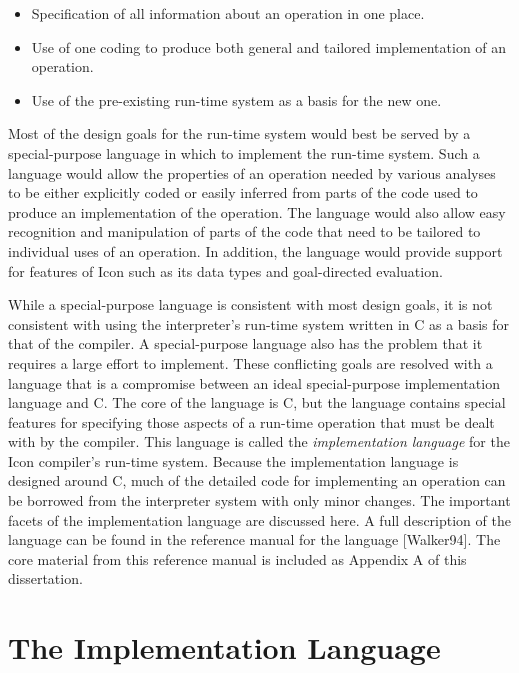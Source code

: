\liststyleLxx
\begin{itemize}

\item Specification of all information about an operation in one place. 

\item Use of one coding to produce both general and tailored
implementation of an operation.

\item Use of the pre-existing run-time system as a basis for the new one. 

\end{itemize}

Most of the design goals for the run-time system would best be served
by a special-purpose language in which to implement the run-time
system. Such a language would allow the properties of an operation
needed by various analyses to be either explicitly coded or easily
inferred from parts of the code used to produce an implementation of
the operation. The language would also allow easy recognition and
manipulation of parts of the code that need to be tailored to
individual uses of an operation. In addition, the language would
provide support for features of Icon such as its data types and
goal-directed evaluation.

While a special-purpose language is consistent with most design goals,
it is not consistent with using the interpreter's run-time system
written in C as a basis for that of the compiler. A special-purpose
language also has the problem that it requires a large effort to
implement. These conflicting goals are resolved with a language that
is a compromise between an ideal special-purpose implementation
language and C. The core of the language is C, but the language
contains special features for specifying those aspects of a run-time
operation that must be dealt with by the compiler.  This language is
called the \textit{implementation language} for the Icon compiler's
run-time system. Because the implementation language is designed
around C, much of the detailed code for implementing an operation can
be borrowed from the interpreter system with only minor changes. The
important facets of the implementation language are discussed here. A
full description of the language can be found in the reference manual
for the language [Walker94]. The core material from this reference
manual is included as Appendix A of this dissertation.


\section{The Implementation Language}


